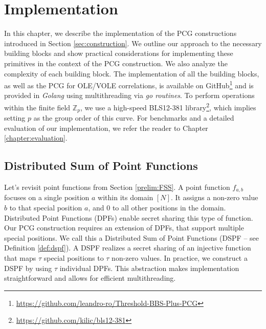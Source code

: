 \chapter{Implementation}
\label{chapter:ImplementingPCGs}
In this chapter, we describe the implementation of the PCG constructions introduced in Section \ref{sec:construction}. We outline our approach to the necessary building blocks and show practical considerations for implementing these primitives in the context of the PCG construction. We also analyze the complexity of each building block. The implementation of all the building blocks, as well as the PCG for OLE/VOLE correlations, is available on GitHub\footnote{\url{https://github.com/leandro-ro/Threshold-BBS-Plus-PCG}} and is provided in \textit{Golang} using multithreading via \textit{go routines}. To perform operations within the finite field $\mathbb{Z}_p$, we use a high-speed BLS12-381 library\footnote{\url{https://github.com/kilic/bls12-381}}, which implies setting $p$ as the group order of this curve. For benchmarks and a detailed evaluation of our implementation, we refer the reader to Chapter \ref{chapter:evaluation}.

\section{Distributed Sum of Point Functions}
\label{sec:dspfImplementation}
Let's revisit point functions from Section \ref{prelim:FSS}.  A point function $f_{a,b}$ focuses on a single position $a$ within its domain $[N]$. It assigns a non-zero value $b$ to that special position $a$, and $0$ to all other positions in the domain. Distributed Point Functions (DPFs) enable secret sharing this type of function. Our PCG construction requires an extension of DPFs, that support multiple special positions. We call this a Distributed Sum of Point Functions (DSPF – see Definition \ref{def:dspf}). A DSPF realizes a secret sharing of an injective function that maps $\tau$ special positions to $\tau$ non-zero values. In practice, we construct a DSPF by using $\tau$ individual DPFs. This abstraction makes implementation straightforward and allows for efficient multithreading.

